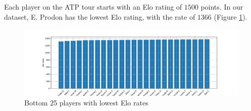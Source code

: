 \documentclass[preprint,aps,nofootinbib,a4paper,superscriptaddress,longbibliography,amsfonts,amssymb,amsmath,titlepage]{revtex4-2}
\begin{document}
%
Each player on the ATP tour starts with an Elo rating of $1500$ points. In our dataset, E. Prodon has the lowest Elo rating, with the rate of $1366$ (Figure \ref{bottom-25-elo-rates}).
%
\begin{figure}[h]
\includegraphics[width=\textwidth]{pictures/bottom-25-elo-rates.pdf}
\caption{Bottom 25 players with lowest Elo rates}
\label{bottom-25-elo-rates}
\end{figure}
%
\end{document}
